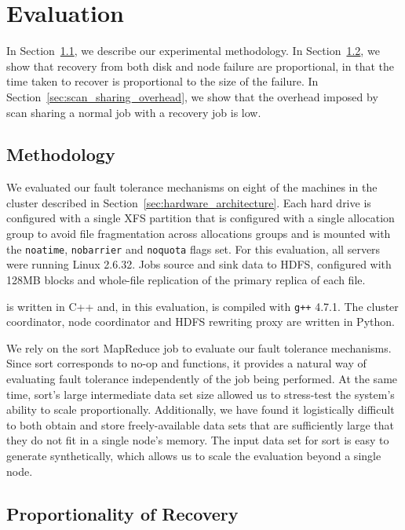 \section{Evaluation}
\label{fault_tolerance:sec:eval}

In Section~\ref{fault_tolerance:sec:methodology}, we describe our experimental methodology. In
Section~\ref{sec:proportionality}, we show that recovery from both disk and
node failure are proportional, in that the time taken to recover is
proportional to the size of the failure. In
Section~\ref{sec:scan_sharing_overhead}, we show that the overhead imposed by
scan sharing a normal job with a recovery job is low.

\subsection{Methodology}
\label{fault_tolerance:sec:methodology}

We evaluated our fault tolerance mechanisms on eight of the machines in the
cluster described in Section~\ref{sec:hardware_architecture}. Each hard drive
is configured with a single XFS partition that is configured with a single
allocation group to avoid file fragmentation across allocations groups and is
mounted with the \texttt{noatime}, \texttt{nobarrier} and \texttt{noquota}
flags set. For this evaluation, all servers were running Linux 2.6.32. Jobs
source and sink data to HDFS, configured with 128MB blocks and whole-file
replication of the primary replica of each file.

\themis is written in C++ and, in this evaluation, is compiled with
\texttt{g++} 4.7.1. The cluster coordinator, node coordinator and HDFS
rewriting proxy are written in Python.

We rely on the sort MapReduce job to evaluate our fault tolerance
mechanisms. Since sort corresponds to no-op \map and \reduce functions, it
provides a natural way of evaluating fault tolerance independently of the job
being performed. At the same time, sort's large intermediate data set size
allowed us to stress-test the system's ability to scale
proportionally. Additionally, we have found it logistically difficult to both
obtain and store freely-available data sets that are sufficiently large that
they do not fit in a single node's memory. The input data set for sort is easy
to generate synthetically, which allows us to scale the evaluation beyond a
single node.

\subsection{Proportionality of Recovery}
\label{sec:proportionality}

